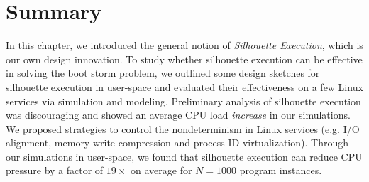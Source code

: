 \newpage
\section{Summary}
In this chapter, we introduced the general notion of {\em Silhouette Execution},
which is our own design innovation. To study whether silhouette execution
can be effective in solving the boot storm problem, we outlined some design
sketches for silhouette execution in user-space and evaluated their
effectiveness on a few Linux services via simulation and modeling. Preliminary
analysis of silhouette execution was discouraging and showed
an average CPU load {\em increase} in our simulations. We proposed
strategies to control the nondeterminism in Linux services
(e.g. I/O alignment, memory-write compression and process ID virtualization). Through our
simulations in user-space, we found that silhouette execution can reduce CPU
pressure by a factor of $19\times$ on average for $N = 1000$ program instances.


